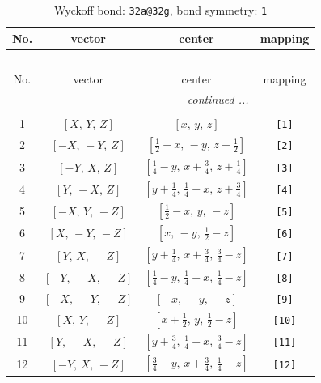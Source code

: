 \documentclass[fleqn,8pt]{jsarticle}
\begin{document}
\begin{longtable}{cccc}
\caption{Wyckoff bond: {\tt 32a@32g}, bond symmetry: {\tt 1}}
 \\
 \hline \hline
No. & vector & center & mapping \\ \hline \endfirsthead

\multicolumn{3}{l}{\tablename\ \thetable{}} \\
 \hline \hline
No. & vector & center & mapping \\ \hline \endhead

 \hline \hline
\multicolumn{3}{r}{\footnotesize\it continued ...} \\ \endfoot

 \hline \hline
\multicolumn{3}{r}{} \\ \endlastfoot

1 & $\left[ X,\, Y,\, Z \right]$ & $\left[ x,\, y,\, z \right]$ & {\tt [1]} \\ \hline
2 & $\left[ - X,\, - Y,\, Z \right]$ & $\left[ \frac{1}{2} - x,\, - y,\, z + \frac{1}{2} \right]$ & {\tt [2]} \\ \hline
3 & $\left[ - Y,\, X,\, Z \right]$ & $\left[ \frac{1}{4} - y,\, x + \frac{3}{4},\, z + \frac{1}{4} \right]$ & {\tt [3]} \\ \hline
4 & $\left[ Y,\, - X,\, Z \right]$ & $\left[ y + \frac{1}{4},\, \frac{1}{4} - x,\, z + \frac{3}{4} \right]$ & {\tt [4]} \\ \hline
5 & $\left[ - X,\, Y,\, - Z \right]$ & $\left[ \frac{1}{2} - x,\, y,\, - z \right]$ & {\tt [5]} \\ \hline
6 & $\left[ X,\, - Y,\, - Z \right]$ & $\left[ x,\, - y,\, \frac{1}{2} - z \right]$ & {\tt [6]} \\ \hline
7 & $\left[ Y,\, X,\, - Z \right]$ & $\left[ y + \frac{1}{4},\, x + \frac{3}{4},\, \frac{3}{4} - z \right]$ & {\tt [7]} \\ \hline
8 & $\left[ - Y,\, - X,\, - Z \right]$ & $\left[ \frac{1}{4} - y,\, \frac{1}{4} - x,\, \frac{1}{4} - z \right]$ & {\tt [8]} \\ \hline
9 & $\left[ - X,\, - Y,\, - Z \right]$ & $\left[ - x,\, - y,\, - z \right]$ & {\tt [9]} \\ \hline
10 & $\left[ X,\, Y,\, - Z \right]$ & $\left[ x + \frac{1}{2},\, y,\, \frac{1}{2} - z \right]$ & {\tt [10]} \\ \hline
11 & $\left[ Y,\, - X,\, - Z \right]$ & $\left[ y + \frac{3}{4},\, \frac{1}{4} - x,\, \frac{3}{4} - z \right]$ & {\tt [11]} \\ \hline
12 & $\left[ - Y,\, X,\, - Z \right]$ & $\left[ \frac{3}{4} - y,\, x + \frac{3}{4},\, \frac{1}{4} - z \right]$ & {\tt [12]} \\ \hline

\end{longtable}
\end{document}

